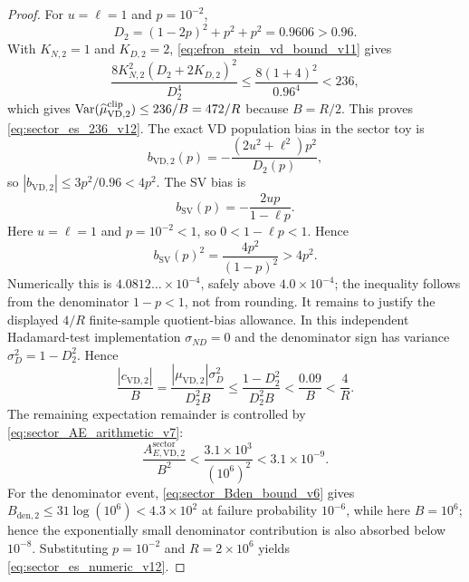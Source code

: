 \documentclass[11pt]{article}
\newcommand{\Var}{\operatorname{Var}}
\newcommand{\1}{\mathbf{1}}
\newcommand{\abs}[1]{\left\lvert #1 \right\rvert}
\begin{document}
\begin{proof}
For \(u=\ell=1\) and \(p=10^{-2}\),
\begin{equation}
    D_2=(1-2p)^2+p^2+p^2=0.9606>0.96.
\end{equation}
With \(K_{N,2}=1\) and \(K_{D,2}=2\), \cref{eq:efron_stein_vd_bound_v11} gives
\begin{equation}
    \frac{8K_{N,2}^2(D_2+2K_{D,2})^2}{D_2^4}
    \le \frac{8(1+4)^2}{0.96^4}<236,
\end{equation}
which gives \(\Var(\widehat\mu_{\mathrm{VD},2}^{\rm clip})\le236/B=472/R\) because \(B=R/2\).  This proves \cref{eq:sector_es_236_v12}.  The exact VD population bias in the sector toy is
\begin{equation}
    b_{\mathrm{VD},2}(p)=-\frac{(2u^2+\ell^2)p^2}{D_2(p)},
\end{equation}
so \(\abs{b_{\mathrm{VD},2}}\le 3p^2/0.96<4p^2\).  The SV bias is
\begin{equation}
    b_{\mathrm{SV}}(p)=-\frac{2up}{1-\ell p}.
\end{equation}
Here \(u=\ell=1\) and \(p=10^{-2}<1\), so \(0<1-\ell p<1\).  Hence
\begin{equation}
    b_{\mathrm{SV}}(p)^2
    =\frac{4p^2}{(1-p)^2}
    >4p^2.
    \label{eq:sector_sv_floor_margin_v14}
\end{equation}
Numerically this is \(4.0812\ldots\times10^{-4}\), safely above \(4.0\times10^{-4}\); the inequality follows from the denominator \(1-p<1\), not from rounding.  It remains to justify the displayed \(4/R\) finite-sample quotient-bias allowance.  In this independent Hadamard-test implementation \(\sigma_{ND}=0\) and the denominator sign has variance \(\sigma_D^2=1-D_2^2\).  Hence
\begin{equation}
    \frac{\abs{c_{\mathrm{VD},2}}}{B}
    =\frac{\abs{\mu_{\mathrm{VD},2}}\sigma_D^2}{D_2^2B}
    \le \frac{1-D_2^2}{D_2^2B}<\frac{0.09}{B}<\frac{4}{R}.
\end{equation}
The remaining expectation remainder is controlled by \cref{eq:sector_AE_arithmetic_v7}:
\begin{equation}
    \frac{A_{E,\mathrm{VD},2}^{\mathrm{sector}}}{B^2}
    <\frac{3.1\times10^3}{(10^6)^2}<3.1\times10^{-9}.
\end{equation}
For the denominator event, \cref{eq:sector_Bden_bound_v6} gives \(B_{\mathrm{den},2}\le31\log(10^6)<4.3\times10^2\) at failure probability \(10^{-6}\), while here \(B=10^6\); hence the exponentially small denominator contribution is also absorbed below \(10^{-8}\).  Substituting \(p=10^{-2}\) and \(R=2\times10^6\) yields \cref{eq:sector_es_numeric_v12}.
\end{proof}
\end{document}
